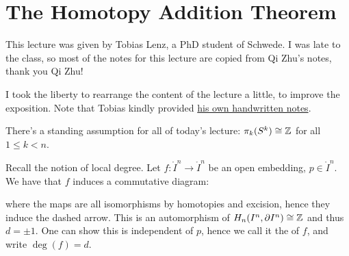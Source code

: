 
\section{The Homotopy Addition Theorem}


This lecture was given by Tobias Lenz, a PhD student of Schwede. I was late to the class, so most of the notes for this lecture are copied from Qi Zhu's notes, thank you Qi Zhu!

\begin{warning}
I took the liberty to rearrange the content of the lecture a little, to improve the exposition. Note that Tobias kindly provided \href{https://uni-bonn.sciebo.de/s/OcE4uI7eVAPzhXg}{his own handwritten notes}.
\end{warning}

\begin{remark}
There's a standing assumption for all of today's lecture: $\pi_k(S^k)\cong{\mathbb Z}$ for all $1\leq k<n$.
\end{remark}

Recall the notion of local degree. Let $f:\ring I^n\to\ring I^n $ be an open embedding, $p\in\ring I^n$. We have that $f$ induces a commutative diagram:
\begin{center}
\end{center}
where the maps are all isomorphisms by homotopies and excision, hence they induce the dashed arrow. This is an automorphism of $H_n(I^n,\partial I^n)\cong{\mathbb Z}$ and thus $d=\pm1$. One can show this is independent of $p$, hence we call it the  of $f$, and write $\deg(f)=d$.

